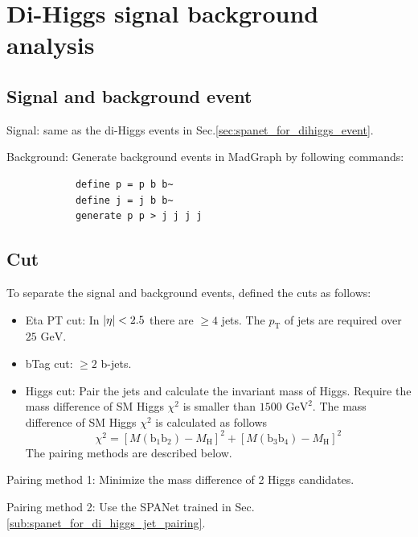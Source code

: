 \documentclass[12pt]{article}
\begin{document}
\section{Di-Higgs signal background analysis}%
\label{sec:di_higgs_signal_background_analysis}
	\subsection{Signal and background event}%
	\label{sub:signal_and_background_event}
		Signal: same as the di-Higgs events in Sec.\ref{sec:spanet_for_dihiggs_event}.

		Background: Generate background events in MadGraph by following commands:
		\begin{verbatim}
			define p = p b b~
			define j = j b b~
			generate p p > j j j j
		\end{verbatim}
	

	\subsection{Cut}%
	\label{sub:cut}
		
		To separate the signal and background events, defined the cuts as follows:
		\begin{itemize}
			\item Eta PT cut: In $\abs{\eta} < 2.5$ there are $\ge 4$ jets. The $p_\text{T}$ of jets are required over $25 \text{ GeV}$.
			\item bTag cut: $\ge 2$ b-jets.
			\item Higgs cut: Pair the jets and calculate the invariant mass of Higgs. Require the mass difference of SM Higgs $\chi^2$ is smaller than $1500 \text{ GeV}^2$. The mass difference of SM Higgs $\chi^2$ is calculated as follows
			\[
				\chi^2 = [M(\text{b}_1\text{b}_2) - M_\text{H}]^2 + [M(\text{b}_3\text{b}_4) - M_\text{H}]^2
			\] 
			The pairing methods are described below.
		\end{itemize}
		
		Pairing method 1: Minimize the mass difference of 2 Higgs candidates.

		Pairing method 2: Use the SPANet trained in Sec.\ref{sub:spanet_for_di_higgs_jet_pairing}.
\end{document}
